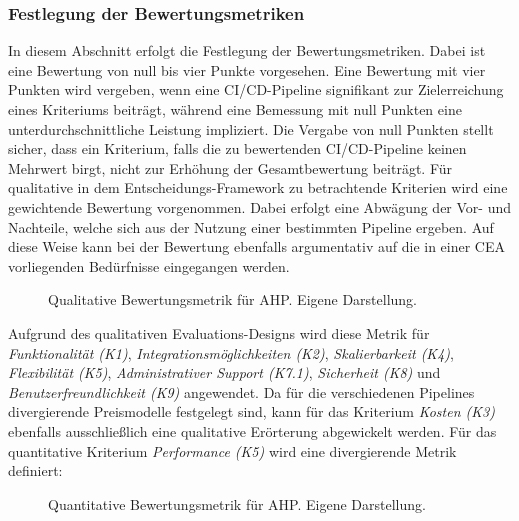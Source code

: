\subsubsection{Festlegung der Bewertungsmetriken}
\label{sec:Metriken}
In diesem Abschnitt erfolgt die Festlegung der Bewertungsmetriken. Dabei ist eine Bewertung von null bis vier Punkte vorgesehen. Eine Bewertung mit vier Punkten wird vergeben, wenn eine CI/CD-Pipeline signifikant zur Zielerreichung eines Kriteriums beiträgt, während eine Bemessung mit null Punkten eine unterdurchschnittliche Leistung impliziert. Die Vergabe von null Punkten stellt sicher, dass ein Kriterium, falls die zu bewertenden CI/CD-Pipeline keinen Mehrwert birgt, nicht zur Erhöhung der Gesamtbewertung beiträgt. Für qualitative in dem Entscheidungs-Framework zu betrachtende Kriterien wird eine gewichtende Bewertung vorgenommen. Dabei erfolgt eine Abwägung der Vor- und Nachteile, welche sich aus der Nutzung einer bestimmten Pipeline ergeben. Auf diese Weise kann bei der Bewertung ebenfalls argumentativ auf die in einer CEA vorliegenden Bedürfnisse eingegangen werden.
\begin{center}
	\begin{figure}[H]
		\centering
		\caption[Qualitative Bewertungsmetrik für AHP]{Qualitative Bewertungsmetrik für AHP. Eigene Darstellung.}
		\label{fig:metrik}
	\end{figure}
\end{center}
\vspace*{-15mm}
Aufgrund des qualitativen Evaluations-Designs wird diese Metrik für \textit{Funktionalität (K1)}, \textit{Integrationsmöglichkeiten (K2)}, \textit{Skalierbarkeit (K4)}, \textit{Flexibilität (K5)}, \textit{Administrativer Support (K7.1)}, \textit{Sicherheit (K8)} und \textit{Benutzerfreundlichkeit (K9)} angewendet. Da für die verschiedenen Pipelines divergierende Preismodelle festgelegt sind, kann für das Kriterium \textit{Kosten (K3)} ebenfalls ausschließlich eine qualitative Erörterung abgewickelt werden. Für das quantitative Kriterium \textit{Performance (K5)} wird eine divergierende Metrik definiert: 
\begin{center}
	\begin{figure}[H]
		\centering
		\caption[Quantitative Bewertungsmetrik für AHP]{Quantitative Bewertungsmetrik für AHP. Eigene Darstellung.}
		\label{fig:metrik_qual}
	\end{figure}
\end{center}
